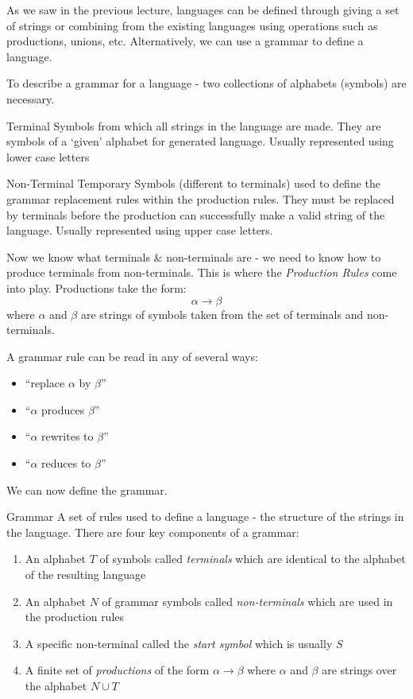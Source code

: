 
As we saw in the previous lecture, languages can be defined through giving a set of strings or combining from the existing languages using operations such as productions, unions, etc. Alternatively, we can use a grammar to define a language. 

To describe a grammar for a language - two collections of alphabets (symbols) are necessary.
\begin{define}
\item[Terminal] Symbols from which all strings in the language are made. They are symbols of a `given' alphabet for generated language. Usually represented using lower case letters
\item[Non-Terminal] Temporary Symbols (different to terminals) used to define the grammar replacement rules within the production rules. They must be replaced by terminals before the production can successfully make a valid string of the language. Usually represented using upper case letters.
\end{define}

Now we know what terminals \& non-terminals are - we need to know how to produce terminals from non-terminals. This is where the \textit{Production Rules} come into play. Productions take the form:
\[\alpha \rightarrow \beta\]
where $\alpha$ and $\beta$ are strings of symbols taken from the set of terminals and non-terminals. 

A grammar rule can be read in any of several ways:
\begin{multicols}{2}
    \begin{itemize}
        \item ``replace $\alpha$ by $\beta$''
        \item ``$\alpha$ produces $\beta$''
        \item ``$\alpha$ rewrites to $\beta$''
        \item ``$\alpha$ reduces to $\beta$''
    \end{itemize}
\end{multicols}
We can now define the grammar.

\begin{define}
\item[Grammar] A set of rules used to define a language - the structure of the strings in the language. There are four key components of a grammar:
\begin{enumerate}
    \item An alphabet $T$ of symbols called \textit{terminals} which are identical to the alphabet of the resulting language
    \item An alphabet $N$ of grammar symbols called \textit{non-terminals} which are used in the production rules
    \item A specific non-terminal called the \textit{start symbol} which is usually $S$
    \item A finite set of \textit{productions} of the form $\alpha \rightarrow \beta$ where $\alpha$ and $\beta$ are strings over the alphabet $N \cup T$
\end{enumerate}
\end{define}

